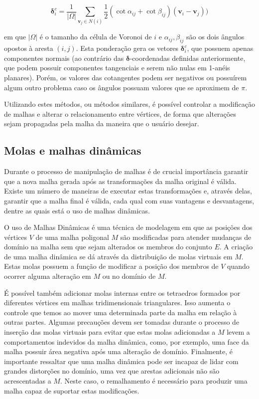 \begin{equation}
	\mathbf{\delta}_i^c = \frac{1}{|\Omega|} \sum_{\mathbf{v}_j \in N(i)} \frac{1}{2} (\cot \alpha_{ij} + \cot \beta_{ij})(\mathbf{v}_i - \mathbf{v}_j))
\end{equation}

\noindent em que $|\Omega|$ é o tamanho da célula de Voronoi de $i$ e $\alpha_{ij}, \beta_{ij}$ são os dois ângulos opostos à aresta $(i, j)$. Esta ponderação gera os vetores $\mathbf{\delta}_i^c$, que possuem apenas componentes normais (ao contrário das $\mathbf{\delta}$-coordenadas definidas anteriormente, que podem possuir componentes tangenciais e serem não nulas em 1-anéis planares). Porém, os valores das cotangentes podem ser negativos ou possuírem algum outro problema caso os ângulos possuam valores que se aproximem de $\pi$.

Utilizando estes métodos, ou métodos similares, é possível controlar a modificação de malhas e alterar o relacionamento entre vértices, de forma que alterações sejam propagadas pela malha da maneira que o usuário desejar.

\subsection{Molas e malhas dinâmicas}
\label{MD}
Durante o processo de manipulação de malhas é de crucial importância garantir que a nova malha gerada após as transformações da malha original é válida. Existe um número de maneiras de executar estas transformações e, através delas, garantir que a malha final é válida, cada qual com suas vantagens e desvantagens, dentre as quais está o uso de malhas dinâmicas.

\begin{defi}
    O uso de Malhas Dinâmicas é uma técnica de modelagem em que as posições dos vértices $V$ de uma malha poligonal $M$ são modificadas para atender mudanças de domínio na malha sem que sejam alterados os membros do conjunto $E$. A criação de uma malha dinâmica se dá através da distribuição de molas virtuais em $M$. Estas molas possuem a função de modificar a posição dos membros de $V$ quando ocorrer alguma alteração em $M$ ou no domínio de $M$.\cite{soares2007}
\end{defi}

É possível também adicionar molas internas entre os tetraedros formados por diferentes vértices em malhas tridimensionais triangulares\cite{soares2007}. 
Isso aumenta o controle que temos ao mover uma determinada parte da malha em relação à outras partes.
Algumas precauções devem ser tomadas durante o processo de inserção das molas virtuais para evitar que estas molas adicionadas a $M$ levem a comportamentos indevidos da malha dinâmica, como, por exemplo, uma face da malha possuir área negativa após uma alteração de domínio. Finalmente, é importante ressaltar que uma malha dinâmica pode ser incapaz de lidar com grandes distorções no domínio, uma vez que arestas adicionais não são acrescentadas a $M$. Neste caso, o remalhamento é necessário para produzir uma malha capaz de suportar estas modificações.

